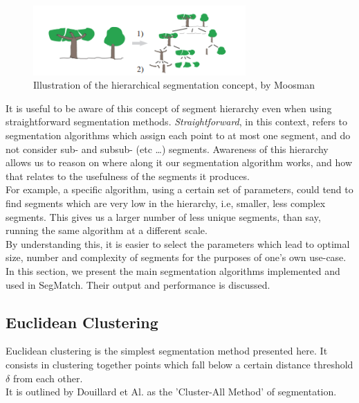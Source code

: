 \begin{figure}
  \centering
  \includegraphics[width=3.2in]{images/hierarchical.png}
  \caption{Illustration of the hierarchical segmentation concept, by Moosman \cite{moosmann2011unsupervised}}
  \label{fig:hierarchical}
\end{figure}

It is useful to be aware of this concept of segment hierarchy even when using straightforward segmentation methods. \textit{Straightforward}, in this context, refers to segmentation algorithms which assign each point to at most one segment, and do not consider sub- and subsub- (etc \ldots) segments. Awareness of this hierarchy allows us to reason on where along it our segmentation algorithm works, and how that relates to the usefulness of the segments it produces.\\

For example, a specific algorithm, using a certain set of parameters, could tend to find segments which are very low in the hierarchy, i.e, smaller, less complex segments. This gives us a larger number of less unique segments, than say, running the same algorithm at a different scale.\\

By understanding this, it is easier to select the parameters which lead to optimal size, number and complexity of segments for the purposes of one's own use-case.\\

In this section, we present the main segmentation algorithms implemented and used in SegMatch. Their output and performance is discussed.\\

\subsection{Euclidean Clustering}
\label{subsec:euclidean}

Euclidean clustering is the simplest segmentation method presented here. It consists in clustering together points which fall below a certain distance threshold $\delta$ from each other.\\

It is outlined by Douillard et Al. \cite{douillard2011segmentation} as the 'Cluster-All Method' of segmentation.\\

